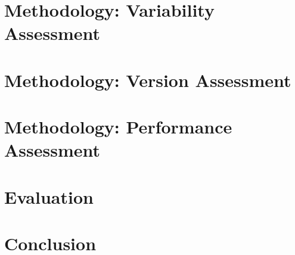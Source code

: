 \documentclass[
	12pt,
	a4paper,
	oneside,
	openright,
	listof=totoc%
]{scrbook}
\begin{document}
\chapter{Methodology: Variability Assessment}\label{sec:chapter:3}


\chapter{Methodology: Version Assessment}\label{chapter:4}


\chapter{Methodology: Performance Assessment}\label{chapter:5}


\chapter{Evaluation} \label{chapter:6}


%

\chapter{Conclusion}\label{chapter:7}



\end{document}
